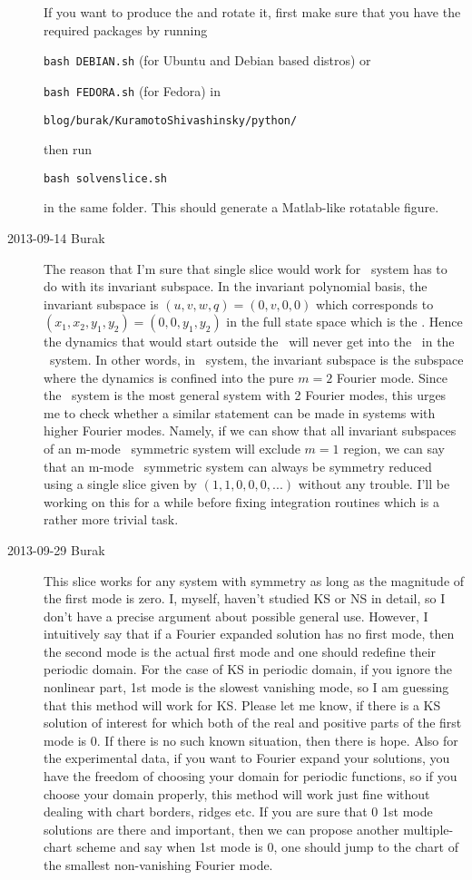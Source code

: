 \begin{description}
If you want to produce the  and rotate it, first
make sure that you have the required packages by running

\texttt{bash DEBIAN.sh} (for Ubuntu and Debian based distros) or

\texttt{bash FEDORA.sh} (for Fedora) in

\texttt{blog/burak/KuramotoShivashinsky/python/}

then run

\texttt{bash solvenslice.sh}

in the same folder. This should generate a Matlab-like rotatable figure.

\item[2013-09-14 Burak]
The reason that I'm sure that single slice would work for \twoMode\ system
has to do with its invariant subspace. In the invariant polynomial basis,
the invariant subspace is $(u,v,w,q) = (0,v,0,0)$ which corresponds to
$(x_1,x_2,y_1,y_2) = (0,0,y_1,y_2)$
in the full state space which is the \chartBord. Hence the dynamics that
would start outside the \chartBord\ will never get into the \chartBord\
in the \twoMode\ system. In other words, in \twoMode\ system, the invariant
subspace is the subspace where the dynamics is confined into the pure $m=2$
Fourier mode. Since the \twoMode\ system is the most general system with
2 Fourier modes, this urges me to check whether a similar statement can
be made in systems with higher Fourier modes. Namely, if we can show that
all invariant subspaces of an m-mode \ symmetric system will exclude
$m = 1$ region, we can say that an m-mode \SOn{2}\ symmetric system can always
be symmetry reduced using a single slice given by $(1,1,0,0,0,...)$ without
any trouble. I'll be working on this for a while before fixing integration
routines which is a rather more trivial task.

\item[2013-09-29 Burak]
This slice works for any system with  symmetry as long as the
magnitude of the first mode is zero. I, myself, haven't studied KS or NS
in detail, so I don't have a precise argument about possible general use.
However, I intuitively say that if a Fourier expanded solution has no first
mode, then the second mode is the actual first mode and one should redefine
their periodic domain. For the case of KS in periodic domain, if you ignore
the nonlinear part, 1st mode is the slowest vanishing mode, so I am guessing
that this method will work for KS. Please let me know, if there is a KS solution
of interest for which both of the real and positive parts of the first mode
is 0. If there is no such known situation, then there is hope. Also for the
experimental data, if you want to Fourier expand your solutions, you have
the freedom of choosing your domain for periodic functions, so if you choose
your domain properly, this method will work just fine without dealing with
chart borders, ridges etc. If you are sure that 0 1st mode solutions are
there and important, then we can propose another multiple-chart scheme and
say when 1st mode is 0, one should jump to the chart of the smallest non-vanishing
Fourier mode.


\end{description}
